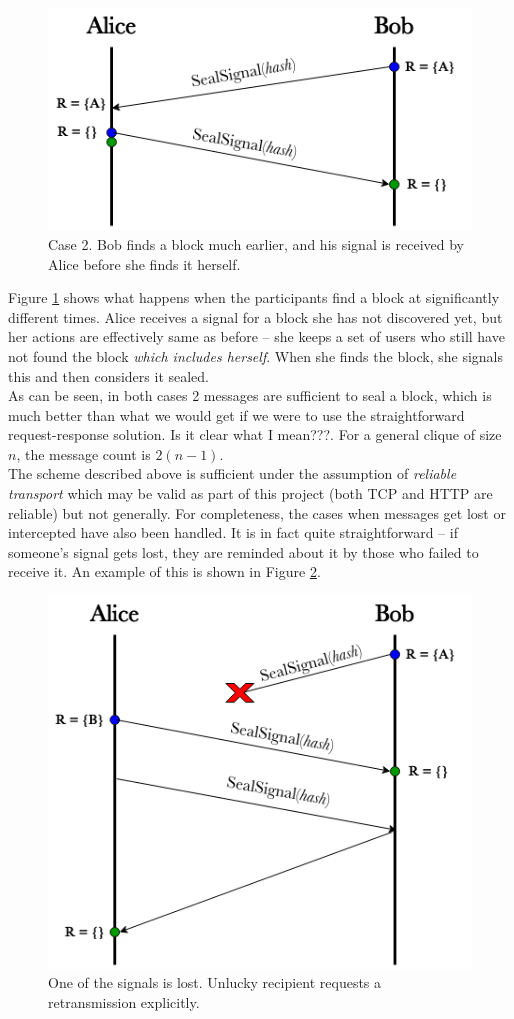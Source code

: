 \documentclass[a4paper, 12pt]{report}
\begin{document}
\begin{figure}[H]
    \captionsetup{width=0.76\textwidth}
    \centering
    \includegraphics[width=0.6\linewidth]{pics/sealing_lag.png}
    \caption{\label{fig:sealing_lag} Case 2. Bob finds a block much earlier, and his signal is received by Alice before she finds it herself.}
\end{figure}

Figure \ref{fig:sealing_lag} shows what happens when the participants find a block at significantly different times. Alice receives a signal for a block she has not discovered yet, but her actions are effectively same as before -- she keeps a set of users who still have not found the block \emph{which includes herself}. When she finds the block, she signals this and then considers it sealed. \\


As can be seen, in both cases 2 messages are sufficient to seal a block, which is much better than what we would get if we were to use the straightforward request-response solution. {\color{red} Is it clear what I mean???}. For a general clique of size $n$, the message count is $2(n-1)$. \\

The scheme described above is sufficient under the assumption of \emph{reliable transport} which may be valid as part of this project (both TCP and HTTP are reliable) but not generally. For completeness, the cases when messages get lost or intercepted have also been handled. It is in fact quite straightforward -- if someone's signal gets lost, they are reminded about it by those who failed to receive it. An example of this is shown in Figure \ref{fig:sealing_lost}.

\begin{figure}[H]
    \captionsetup{width=0.76\textwidth}
    \centering
    \includegraphics[width=0.6\linewidth]{pics/sealing_lost.png}
    \caption{\label{fig:sealing_lost} One of the signals is lost. Unlucky recipient requests a retransmission explicitly.}
\end{figure}
\end{document}
